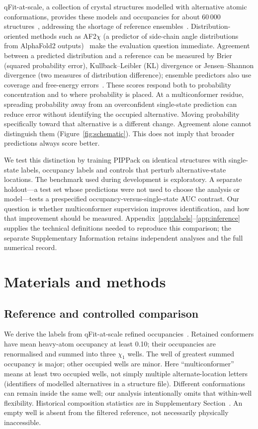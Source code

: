 \documentclass[10pt,twocolumn,a4paper]{article}
\begin{document}
qFit-at-scale, a collection of crystal structures modelled with alternative atomic conformations, provides these models and occupancies for about 60\,000
structures~\citep{wankowicz2026qfitatscale}, addressing the shortage of reference
ensembles~\citep{wankowicz2026perspective}. Distribution-oriented methods such as
AF2$\chi$ (a predictor of side-chain angle distributions from AlphaFold2 outputs)~\citep{cagiada2025af2chi} make the evaluation question immediate. Agreement
between a predicted distribution and a reference can be measured by Brier (squared probability error), Kullback--Leibler (KL) divergence or Jensen--Shannon divergence (two measures of distribution difference); ensemble predictors also use coverage and free-energy
errors~\citep{lewis2025bioemu}. These scores respond both to probability concentration and to where probability is placed. At a multiconformer residue, spreading probability away from an overconfident single-state prediction can reduce error without identifying the occupied alternative. Moving probability specifically toward that alternative is a different change. Agreement alone cannot distinguish them (Figure~\ref{fig:schematic}). This does not imply that broader predictions always score better.

We test this distinction by training PIPPack on identical structures with single-state labels, occupancy labels and controls that perturb alternative-state locations. The benchmark used during development is exploratory. A separate holdout---a test set whose predictions were not used to choose the analysis or model---tests a prespecified occupancy-versus-single-state AUC contrast. Our question is whether multiconformer supervision improves identification, and how that improvement should be measured. Appendix~\ref{app:labels}--\ref{app:inference} supplies the technical definitions needed to reproduce this comparison; the separate Supplementary Information retains independent analyses and the full numerical record.
\section{Materials and methods}
\label{sec:methods}
\subsection{Reference and controlled comparison}
We derive the labels from qFit-at-scale refined occupancies~\citep{wankowicz2026qfitatscale}. Retained conformers have mean heavy-atom occupancy at least 0.10; their occupancies are renormalised and summed into three $\chi_1$ wells. The well of greatest summed occupancy is major; other occupied wells are minor. Here ``multiconformer'' means at least two occupied wells, not simply multiple alternate-location letters (identifiers of modelled alternatives in a structure file). Different conformations can remain inside the same well; our analysis intentionally omits that within-well flexibility. Historical composition statistics are in Supplementary Section~. An empty well is absent from the filtered reference, not necessarily physically inaccessible.
\end{document}
